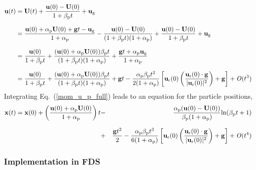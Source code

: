 \begin{align}
    \mathbf{u}(t) &= \mathbf{U}(t) + \frac{\mathbf{u}(0) - \mathbf{U}(0)}{1 + \beta_{\rm p} t} + \mathbf{u}_\text{g} \nonumber \\[.1in]
    &= \frac{\mathbf{u}(0) + \alpha_{\rm p} \mathbf{U}(0) + \mathbf{g} t - \mathbf{u}_\text{g}}{1 + \alpha_{\rm p}} - \frac{\mathbf{u}(0) - \mathbf{U}(0)}{(1 + \beta_{\rm p} t)(1 + \alpha_{\rm p})} + \frac{\mathbf{u}(0) - \mathbf{U}(0)}{1 + \beta_{\rm p} t} + \mathbf{u}_\text{g} \nonumber \\[.1in]
    &= \frac{\mathbf{u}(0)}{1 + \beta_{\rm p} t} + \frac{(\mathbf{u}(0) + \alpha_{\rm p} \mathbf{U}(0))\beta_{\rm p} t}{(1 + \beta_{\rm p} t)(1 + \alpha_{\rm p})} + \frac{\mathbf{g} t + \alpha_{\rm p} \mathbf{u}_\text{g}}{1 + \alpha_{\rm p}} \nonumber \\[.1in]
    &= \frac{\mathbf{u}(0)}{1 + \beta_{\rm p} t} + \frac{(\mathbf{u}(0) + \alpha_{\rm p} \mathbf{U}(0))\beta_{\rm p} t}{(1 + \beta_{\rm p} t)(1 + \alpha_{\rm p})} + \mathbf{g} t - \frac{\alpha_{\rm p} \beta_{\rm p} t^2}{2 (1 + \alpha_{\rm p})} \left[\mathbf{u}_{\text{r}}(0) \left(\frac{\mathbf{u}_{\text{r}}(0) \cdot \mathbf{g}}{|\mathbf{u}_{\text{r}}(0)|^2}\right) + \mathbf{g}\right] + \mathit{O}(t^3) \label{mom_u_p_full}
\end{align}
Integrating Eq.~(\ref{mom_u_p_full}) leads to an equation for the particle positions,
\begin{eqnarray}
    \label{mom_x_p_full}
    \mathbf{x}(t) = \mathbf{x}(0) + \left(\frac{\mathbf{u}(0) + \alpha_{\rm p} \mathbf{U}(0)}{1 + \alpha_{\rm p}}\right) t &-& \frac{\alpha_{\rm p} (\mathbf{u}(0) - \mathbf{U}(0))}{\beta_{\rm p} (1 + \alpha_{\rm p})} \text{ln}(\beta_{\rm p} t + 1) \nonumber \\[.1in]
    &+& \frac{\mathbf{g} t^2}{2} - \frac{\alpha_{\rm p} \beta_{\rm p} t^3}{6 (1 + \alpha_{\rm p})} \left[\mathbf{u}_{\text{r}}(0) \left(\frac{\mathbf{u}_{\text{r}}(0) \cdot \mathbf{g}}{|\mathbf{u}_{\text{r}}(0)|^2}\right) + \mathbf{g}\right] + \mathit{O}(t^4)
\end{eqnarray}

\subsubsection*{Implementation in FDS}

